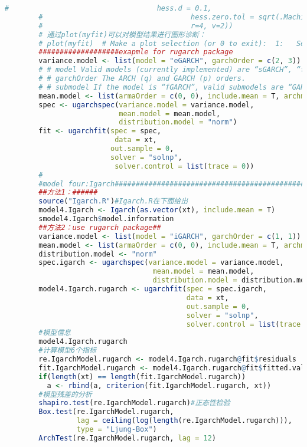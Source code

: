 \begin{lstlisting}[language = R]
        #                                   hess.d = 0.1,
        #                                   hess.zero.tol = sqrt(.Machine$double.eps/7e-7),
        #                                   r=4, v=2))
        # 通过plot(myfit)可以对模型结果进行图形诊断：
        # plot(myfit)  # Make a plot selection (or 0 to exit):  1:   Series with 2 Conditional SD
        ###################exapmle for rugarch package
        variance.model <- list(model = "eGARCH", garchOrder = c(2, 3))
        # # model Valid models (currently implemented) are “sGARCH”, “fGARCH”, “eGARCH”, “gjrGARCH”, “apARCH” and “iGARCH” and “csGARCH”.
        # # garchOrder The ARCH (q) and GARCH (p) orders.
        # # submodel If the model is “fGARCH”, valid submodels are “GARCH”, “TGARCH”, “AVGARCH”, “NGARCH”, “NAGARCH”, “APARCH”,“GJRGARCH” and “ALLGARCH”.
        mean.model <- list(armaOrder = c(0, 0), include.mean = T, archm = F)
        spec <- ugarchspec(variance.model = variance.model,
                           mean.model = mean.model,
                           distribution.model = "norm")
        fit <- ugarchfit(spec = spec,
                          data = xt,
                         out.sample = 0,
                         solver = "solnp",
                          solver.control = list(trace = 0))
        #
        #model four:Igarch#######################################################
        ##方法1：######
        source("Igarch.R")#Igarch.R在下面给出
        model4.Igarch <- Igarch(as.vector(xt), include.mean = T)
        smodel4.Igarch$model.information
        ##方法2：use rugarch package##
        variance.model <- list(model = "iGARCH", garchOrder = c(1, 1))
        mean.model <- list(armaOrder = c(0, 0), include.mean = T, archm = F)
        distribution.model <- "norm"
        spec.igarch <- ugarchspec(variance.model = variance.model,
                                   mean.model = mean.model,
                                   distribution.model = distribution.model)
        model4.Igarch.rugarch <- ugarchfit(spec = spec.igarch,
                                           data = xt,
                                           out.sample = 0,
                                           solver = "solnp",
                                           solver.control = list(trace = 0))
        #模型信息
        model4.Igarch.rugarch
        #计算模型6个指标
        re.IgarchModel.rugarch <- model4.Igarch.rugarch@fit$residuals  #residuals(model4.Igarch.rugarch)
        fit.IgarchModel.rugarch <- model4.Igarch.rugarch@fit$fitted.values  #fitted(model4.Igarch.rugarch)
        if(length(xt) == length(fit.IgarchModel.rugarch))
          a <- rbind(a, criterion(fit.IgarchModel.rugarch, xt))
        #模型残差的分析
        shapiro.test(re.IgarchModel.rugarch)#正态性检验
        Box.test(re.IgarchModel.rugarch,
                 lag = ceiling(log(length(re.IgarchModel.rugarch))),
                 type = "Ljung-Box")
        ArchTest(re.IgarchModel.rugarch, lag = 12)
        \end{lstlisting}
